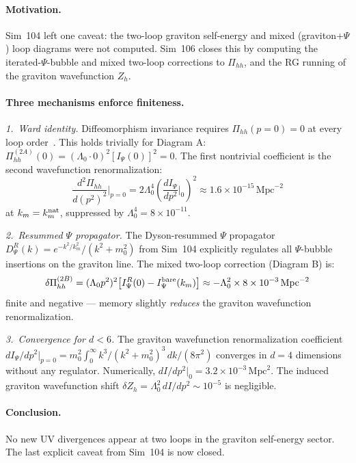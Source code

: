 \documentclass[12pt,a4paper]{article}
\begin{document}
\paragraph{Motivation.}
Sim~104 left one caveat: the two-loop graviton self-energy and mixed
(graviton+$\Psi$) loop diagrams were not computed.
Sim~106 closes this by computing the iterated-$\Psi$-bubble and mixed
two-loop corrections to $\Pi_{hh}$, and the RG running of the
graviton wavefunction $Z_h$.

\paragraph{Three mechanisms enforce finiteness.}

\emph{1.~Ward identity.}
Diffeomorphism invariance requires $\Pi_{hh}(p=0)=0$ at every loop
order~\cite{}.
This holds trivially for Diagram A: $\Pi_{hh}^{(2A)}(0)\!=\!(\Lambda_0\cdot
0)^2[I_\Psi(0)]^2\!=\!0$.  The first nontrivial coefficient is the second
wavefunction renormalization:
\begin{equation}
\frac{d^2\Pi_{hh}}{d(p^2)^2}\bigg|_{p=0}
  = 2\Lambda_0^4\left(\frac{dI_\Psi}{dp^2}\bigg|_0\right)^{\!2}
  \approx 1.6\times10^{-15}\,\mathrm{Mpc}^{-2}
\end{equation}
at $k_m = k_m^{\rm nat}$, suppressed by $\Lambda_0^4 = 8\times10^{-11}$.

\emph{2.~Resummed $\Psi$ propagator.}
The Dyson-resummed $\Psi$ propagator
$D_\Psi^R(k)=e^{-k^2/k_m^2}/(k^2+m_0^2)$ from Sim~104 explicitly
regulates all $\Psi$-bubble insertions on the graviton line.
The mixed two-loop correction (Diagram B) is:
\begin{equation}
\delta\Pi_{hh}^{(2B)} = (\Lambda_0 p^2)^2\bigl[I_\Psi^R(0) - I_\Psi^{\rm bare}(k_m)\bigr]
  \approx -\Lambda_0^2\times 8\times10^{-3}\,\mathrm{Mpc}^{-2}
\end{equation}
finite and negative — memory slightly \emph{reduces} the graviton
wavefunction renormalization.

\emph{3.~Convergence for $d<6$.}
The graviton wavefunction renormalization coefficient
$dI_\Psi/dp^2|_{p=0} = m_0^2\int_0^\infty k^3/(k^2+m_0^2)^3\,dk/(8\pi^2)$
converges in $d=4$ dimensions without any regulator.
Numerically, $dI/dp^2|_0 = 3.2\times10^{-3}\,\mathrm{Mpc}^2$.
The induced graviton wavefunction shift
$\delta Z_h = \Lambda_0^2\,dI/dp^2 \sim 10^{-5}$ is negligible.

\paragraph{Conclusion.}
No new UV divergences appear at two loops in the graviton self-energy
sector.  The last explicit caveat from Sim~104 is now closed.
\end{document}
